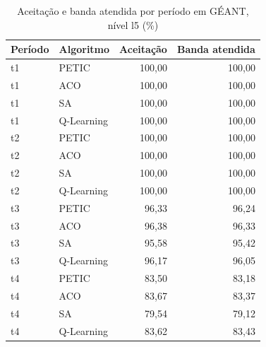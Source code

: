 \begin{table}[htb]
    \centering
    \scriptsize
    \caption{Aceitação e banda atendida por período em GÉANT, nível l5 (\%)}
    \label{tab:periodos-geant-l5}
    \begin{tabular}{llrr}
        \hline
        Período & Algoritmo & Aceitação & Banda atendida \\
        \hline
        t1 & PETIC & 100,00 & 100,00 \\
        t1 & ACO & 100,00 & 100,00 \\
        t1 & SA & 100,00 & 100,00 \\
        t1 & Q-Learning & 100,00 & 100,00 \\
        t2 & PETIC & 100,00 & 100,00 \\
        t2 & ACO & 100,00 & 100,00 \\
        t2 & SA & 100,00 & 100,00 \\
        t2 & Q-Learning & 100,00 & 100,00 \\
        t3 & PETIC & 96,33 & 96,24 \\
        t3 & ACO & 96,38 & 96,33 \\
        t3 & SA & 95,58 & 95,42 \\
        t3 & Q-Learning & 96,17 & 96,05 \\
        t4 & PETIC & 83,50 & 83,18 \\
        t4 & ACO & 83,67 & 83,37 \\
        t4 & SA & 79,54 & 79,12 \\
        t4 & Q-Learning & 83,62 & 83,43 \\
        \hline
    \end{tabular}
\end{table}

